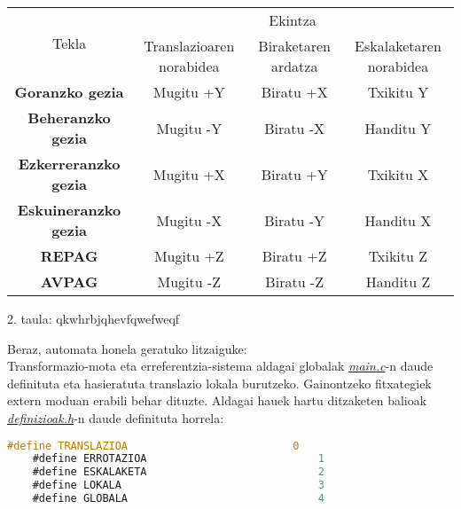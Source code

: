 \documentclass[12pt]{article}
\newcommand{\fitxategi}[1] {\underline{\textit{#1}}}
\begin{document}
\begin{center}

\begin{tabular}{|c|c|c|c|}
																				\hline
	\multirow{2}{*}{Tekla}		& \multicolumn{3}{|c|}{Ekintza} 		\\	\cline{2-4}
	& Translazioaren norabidea & Biraketaren ardatza & Eskalaketaren norabidea 	\\ \hline
	\textbf{Goranzko gezia}		 &  Mugitu +Y & Biratu +X & Txikitu Y		\\	\hline
	\textbf{Beheranzko gezia}	 &  Mugitu -Y & Biratu -X & Handitu Y		\\	\hline
	\textbf{Ezkerreranzko gezia}&  Mugitu +X & Biratu +Y & Txikitu X		\\	\hline
	\textbf{Eskuineranzko gezia}&  Mugitu -X & Biratu -Y & Handitu X		\\	\hline
	\textbf{REPAG}				 &  Mugitu +Z & Biratu +Z & Txikitu Z		\\	\hline
	\textbf{AVPAG}				 &  Mugitu -Z & Biratu -Z & Handitu Z		\\	\hline
\end{tabular}

\vspace{0.3cm}
2. taula: qkwhrbjqhevfqwefweqf
\end{center}


Beraz, automata honela geratuko litzaiguke:\\




Transformazio-mota eta erreferentzia-sistema aldagai globalak \fitxategi{main.c}-n daude definituta eta hasieratuta translazio lokala burutzeko. Gainontzeko fitxategiek extern moduan erabili behar dituzte. Aldagai hauek hartu ditzaketen balioak \fitxategi{definizioak.h}-n daude definituta horrela:

\begin{center}
	\begin{lstlisting}[language=C, basicstyle=\footnotesize]
	#define TRANSLAZIOA                          0
	#define ERROTAZIOA                           1
	#define ESKALAKETA                           2
	#define LOKALA                               3
	#define GLOBALA                              4
	\end{lstlisting}
\end{center}
\end{document}
